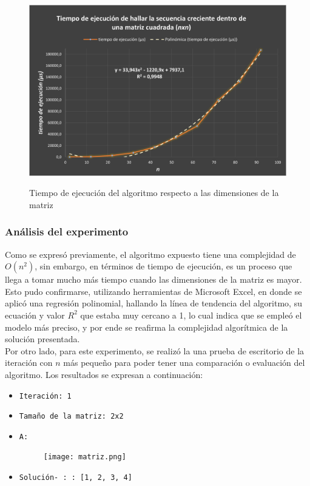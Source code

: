 \documentclass[letter]{article}
\begin{document}
\begin{enumerate}
   \begin{figure}[h]
    \centering
    \includegraphics[scale=0.9]{DataGraphic.png}
    \label{experimentos:aleatorias:grafica}
    \caption{Tiempo de ejecución del algoritmo respecto a las dimensiones de la matriz}
\end{figure} 
    
\end{enumerate}



\subsubsection{Análisis del experimento}
\label{experimentos:aleatorias:analisis}
Como se expresó previamente, el algoritmo expuesto tiene una complejidad de $O(n^{2})$, sin embargo, en términos de tiempo de ejecución, es un proceso que llega a tomar mucho más tiempo cuando las dimensiones de la matriz es mayor. Esto pudo confirmarse, utilizando herramientas de Microsoft Excel, en donde se aplicó una regresión polinomial, hallando la línea de tendencia del algoritmo, su ecuación y valor $R^{2}$ que estaba muy cercano a 1, lo cual indica que se empleó el modelo más preciso, y por ende se reafirma la complejidad algorítmica de la solución presentada.  \\

Por otro lado, para este experimento, se realizó la una prueba de escritorio de la iteración con $n$ más pequeño para poder tener una comparación o evaluación del algoritmo. Los resultados se expresan a continuación: 

\begin{itemize}
        \item \texttt{Iteración: 1} 
        \item \texttt{Tamaño de la matriz: 2x2}
        
        \item 
        \texttt{A: }
        
        \begin{figure}[h]
  
    \texttt{[image: matriz.png]}
    \label{experimentos:aleatorias:grafica}
\end{figure}
    
        \item
        \texttt{Solución- : : [1, 2, 3, 4] }
    \end{itemize}
    
\end{document}
